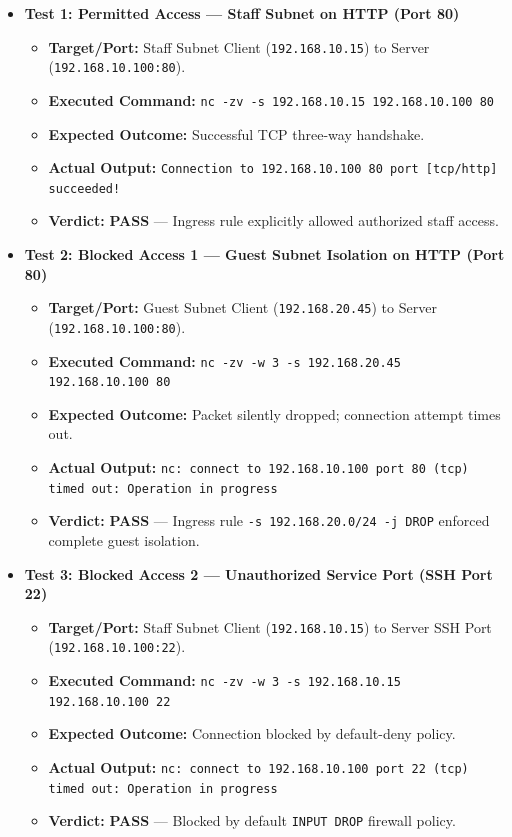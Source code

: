 \documentclass[12pt,a4paper]{article}
\begin{document}
\begin{itemize}[leftmargin=*, itemsep=0.2em]
    \item \textbf{Test 1: Permitted Access — Staff Subnet on HTTP (Port 80)}
    \begin{itemize}[label=$\circ$, leftmargin=1.5em]
        \item \textbf{Target/Port:} Staff Subnet Client (\texttt{192.168.10.15}) to Server (\texttt{192.168.10.100:80}).
        \item \textbf{Executed Command:} \texttt{nc -zv -s 192.168.10.15 192.168.10.100 80}
        \item \textbf{Expected Outcome:} Successful TCP three-way handshake.
        \item \textbf{Actual Output:} \texttt{Connection to 192.168.10.100 80 port [tcp/http] succeeded!}
        \item \textbf{Verdict:} \textbf{PASS} — Ingress rule explicitly allowed authorized staff access.
    \end{itemize}

    \item \textbf{Test 2: Blocked Access 1 — Guest Subnet Isolation on HTTP (Port 80)}
    \begin{itemize}[label=$\circ$, leftmargin=1.5em]
        \item \textbf{Target/Port:} Guest Subnet Client (\texttt{192.168.20.45}) to Server (\texttt{192.168.10.100:80}).
        \item \textbf{Executed Command:} \texttt{nc -zv -w 3 -s 192.168.20.45 192.168.10.100 80}
        \item \textbf{Expected Outcome:} Packet silently dropped; connection attempt times out.
        \item \textbf{Actual Output:} \texttt{nc: connect to 192.168.10.100 port 80 (tcp) timed out: Operation in progress}
        \item \textbf{Verdict:} \textbf{PASS} — Ingress rule \texttt{-s 192.168.20.0/24 -j DROP} enforced complete guest isolation.
    \end{itemize}

    \item \textbf{Test 3: Blocked Access 2 — Unauthorized Service Port (SSH Port 22)}
    \begin{itemize}[label=$\circ$, leftmargin=1.5em]
        \item \textbf{Target/Port:} Staff Subnet Client (\texttt{192.168.10.15}) to Server SSH Port (\texttt{192.168.10.100:22}).
        \item \textbf{Executed Command:} \texttt{nc -zv -w 3 -s 192.168.10.15 192.168.10.100 22}
        \item \textbf{Expected Outcome:} Connection blocked by default-deny policy.
        \item \textbf{Actual Output:} \texttt{nc: connect to 192.168.10.100 port 22 (tcp) timed out: Operation in progress}
        \item \textbf{Verdict:} \textbf{PASS} — Blocked by default \texttt{INPUT DROP} firewall policy.
    \end{itemize}
\end{itemize}
\end{document}
